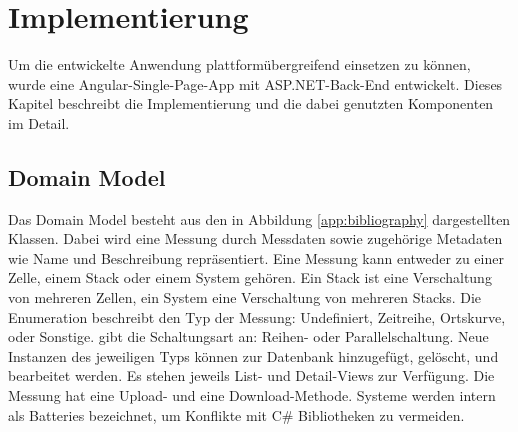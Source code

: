 \chapter{Implementierung}\label{ch:implementation}

Um die entwickelte Anwendung plattformübergreifend einsetzen zu können, wurde eine Angular-Single-Page-App mit ASP.NET-Back-End entwickelt. Dieses Kapitel beschreibt die Implementierung und die dabei genutzten Komponenten im Detail.

\section{Domain Model}

Das Domain Model besteht aus den in Abbildung \ref{app:bibliography} dargestellten Klassen. Dabei wird eine Messung durch Messdaten sowie zugehörige Metadaten wie Name und Beschreibung repräsentiert. Eine Messung kann entweder zu einer Zelle, einem Stack oder einem System gehören. Ein Stack ist eine Verschaltung von mehreren Zellen, ein System eine Verschaltung von mehreren Stacks. Die Enumeration  beschreibt den Typ der Messung: Undefiniert, Zeitreihe, Ortskurve, oder Sonstige.  gibt die Schaltungsart an: Reihen- oder Parallelschaltung. Neue Instanzen des jeweiligen Typs können zur Datenbank hinzugefügt, gelöscht, und bearbeitet werden. Es stehen jeweils List- und Detail-Views zur Verfügung. Die Messung hat eine Upload- und eine Download-Methode. Systeme werden intern als Batteries bezeichnet, um Konflikte mit C\# Bibliotheken zu vermeiden.

